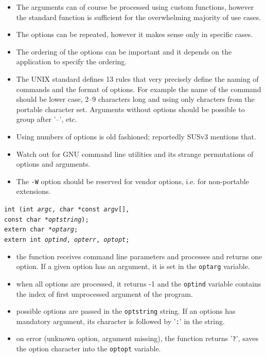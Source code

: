 \begin{itemize}
\item The arguments can of course be processed using custom functions, however
the standard function is sufficient for the overwhelming majority of use cases.
\item The options can be repeated, however it makes sense only in specific
cases.
\item The ordering of the options can be important and it depends on the
application to specify the ordering.
\item The UNIX standard defines 13 rules that very precisely define the naming
of commands and the format of options. For example the name of the command
should be lower case, 2--9 characters long and using only chracters from
the portable character set. Arguments without options should be possible to group
after '--', etc.
\item Using numbers of options is old fashioned; reportedly SUSv3 mentions that.
\item Watch out for GNU command line utilities and its strange permutations
of options and arguments.
\item The \texttt{-W} option should be reserved for vendor options, i.e. for
non-portable extensions.
\end{itemize}



\begin{slide}
\setlength{\baselineskip}{0.8\baselineskip}
\begin{tabbing}
\texttt{int (}\=\texttt{int \emph{argc},
char *const \emph{argv}[],}\\
\>\texttt{const char *\emph{optstring});}\\
\texttt{extern char *\emph{optarg};}\\
\texttt{extern int \emph{optind}, \emph{opterr}, \emph{optopt};} 
\end{tabbing}
\begin{itemize}
\item the function receives command line parameters and processes and returns
one option. If a given option has an argument, it is set in the
\texttt{optarg} variable.
\item when all options are processed, it returns -1 and the \texttt{optind} 
variable contains the index of first unprocessed argument of the program.
\item possible options are passed in the \texttt{optstring} string.
If an options has mandatory argument, its character is followed by '\texttt{:}'
in the string.
\item on error (unknown option, argument missing), the function returns
'\texttt{?}', saves the option character into the \texttt{optopt} variable.
\end{itemize}
\end{slide}

